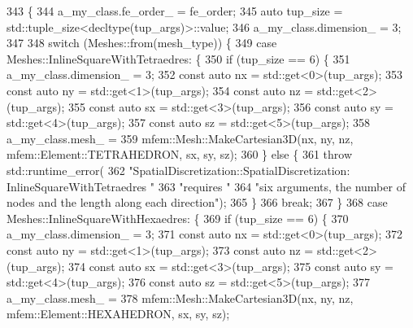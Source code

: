\begin{DoxyCode}
343                                                                    \{
344     a\_my\_class.fe\_order\_ = fe\_order;
345     \textcolor{keyword}{auto} tup\_size = std::tuple\_size<decltype(tup\_args)>::value;
346     a\_my\_class.dimension\_ = 3;
347 
348     \textcolor{keywordflow}{switch} (Meshes::from(mesh\_type)) \{
349       \textcolor{keywordflow}{case} Meshes::InlineSquareWithTetraedres: \{
350         \textcolor{keywordflow}{if} (tup\_size == 6) \{
351           a\_my\_class.dimension\_ = 3;
352           \textcolor{keyword}{const} \textcolor{keyword}{auto} nx = std::get<0>(tup\_args);
353           \textcolor{keyword}{const} \textcolor{keyword}{auto} ny = std::get<1>(tup\_args);
354           \textcolor{keyword}{const} \textcolor{keyword}{auto} nz = std::get<2>(tup\_args);
355           \textcolor{keyword}{const} \textcolor{keyword}{auto} sx = std::get<3>(tup\_args);
356           \textcolor{keyword}{const} \textcolor{keyword}{auto} sy = std::get<4>(tup\_args);
357           \textcolor{keyword}{const} \textcolor{keyword}{auto} sz = std::get<5>(tup\_args);
358           a\_my\_class.mesh\_ =
359               mfem::Mesh::MakeCartesian3D(nx, ny, nz, mfem::Element::TETRAHEDRON, sx, sy, sz);
360         \} \textcolor{keywordflow}{else} \{
361           \textcolor{keywordflow}{throw} std::runtime\_error(
362               \textcolor{stringliteral}{"SpatialDiscretization::SpatialDiscretization: InlineSquareWithTetraedres "}
363               \textcolor{stringliteral}{"requires "}
364               \textcolor{stringliteral}{"six arguments, the number of nodes and the length along each direction"});
365         \}
366         \textcolor{keywordflow}{break};
367       \}
368       \textcolor{keywordflow}{case} Meshes::InlineSquareWithHexaedres: \{
369         \textcolor{keywordflow}{if} (tup\_size == 6) \{
370           a\_my\_class.dimension\_ = 3;
371           \textcolor{keyword}{const} \textcolor{keyword}{auto} nx = std::get<0>(tup\_args);
372           \textcolor{keyword}{const} \textcolor{keyword}{auto} ny = std::get<1>(tup\_args);
373           \textcolor{keyword}{const} \textcolor{keyword}{auto} nz = std::get<2>(tup\_args);
374           \textcolor{keyword}{const} \textcolor{keyword}{auto} sx = std::get<3>(tup\_args);
375           \textcolor{keyword}{const} \textcolor{keyword}{auto} sy = std::get<4>(tup\_args);
376           \textcolor{keyword}{const} \textcolor{keyword}{auto} sz = std::get<5>(tup\_args);
377           a\_my\_class.mesh\_ =
378               mfem::Mesh::MakeCartesian3D(nx, ny, nz, mfem::Element::HEXAHEDRON, sx, sy, sz);

\end{DoxyCode}
